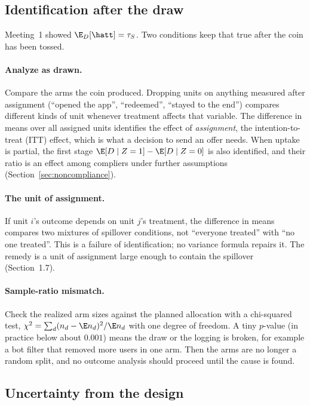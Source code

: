 \documentclass[11pt]{article}
\begin{document}
\subsection{Identification after the draw}

Meeting~1 showed $\E_D[\hatt] = \tau_S$. Two conditions keep that true after the coin has been tossed.

\paragraph{Analyze as drawn.} Compare the arms the coin produced. Dropping units on anything measured
after assignment (``opened the app'', ``redeemed'', ``stayed to the end'') compares different kinds of unit
whenever treatment affects that variable. The difference in means over all assigned units identifies the
effect of \emph{assignment}, the intention-to-treat (ITT) effect, which is what a decision to send an offer
needs. When uptake is partial, the first stage $\E[D \mid Z=1] - \E[D \mid Z=0]$ is also identified, and
their ratio is an effect among compliers under further assumptions (Section~\ref{sec:noncompliance}).

\paragraph{The unit of assignment.} If unit $i$'s outcome depends on unit $j$'s treatment, the difference
in means compares two mixtures of spillover conditions, not ``everyone treated'' with ``no one treated''.
This is a failure of identification; no variance formula repairs it. The remedy is a unit of assignment
large enough to contain the spillover (Section~1.7).

\paragraph{Sample-ratio mismatch.} Check the realized arm sizes against the planned allocation with a
chi-squared test, $\chi^2 = \sum_d (n_d - \E n_d)^2/\E n_d$ with one degree of freedom. A tiny $p$-value (in
practice below about $0.001$) means the draw or the logging is broken, for example a bot filter that removed
more users in one arm. Then the arms are no longer a random split, and no outcome analysis should proceed
until the cause is found.

\subsection{Uncertainty from the design}
\end{document}
